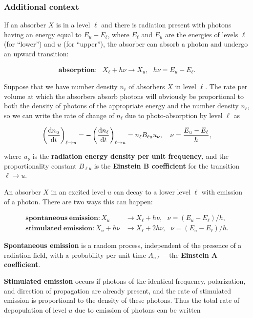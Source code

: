 \documentclass[a4paper,10pt]{article}
\begin{document}
\subsubsection{Additional context}

If an absorber $X$ is in a level $\ell$ and there is radiation present with photons having an energy equal to $E_u-E_\ell$, where $E_\ell$ and $E_u$ are the energies of levels $\ell$ (for ``lower'') and $u$ (for ``upper''), the absorber can absorb a photon and undergo an upward transition:

\begin{align*}
    \mathbf{absorption:} ~~~ X_\ell+h\nu\rightarrow X_u, ~~~ h\nu=E_u-E_\ell.
\end{align*}

{\noindent}Suppose that we have number density $n_\ell$ of absorbers $X$ in level $\ell$. The rate per volume at which the absorbers absorb photons will obviously be proportional to both the density of photons of the appropriate energy and the number density $n_\ell$, so we can write the rate of change of $n_\ell$ due to photo-absorption by level $\ell$ as

\begin{align*}
    \left(\frac{{\rm d}n_u}{{\rm d}t}\right)_{\ell\rightarrow u} = -\left(\frac{{\rm d}n_\ell}{{\rm d}t}\right)_{\ell\rightarrow u} = n_\ell B_{\ell u}u_\nu, ~~~ \nu=\frac{E_u-E_\ell}{h},
\end{align*}

{\noindent}where $u_\nu$ is the \textbf{radiation energy density per unit frequency}, and the proportionality constant $B_{\ell u}$ is the \textbf{Einstein B coefficient} for the transition $\ell\rightarrow u$.

{\noindent}An absorber $X$ in an excited level $u$ can decay to a lower level $\ell$ with emission of a photon. There are two ways this can happen:

\begin{align*}
    \mathbf{spontaneous~emission:} X_u&\rightarrow X_\ell+h\nu, ~~~ \nu=(E_u-E_\ell)/h, \\
    \mathbf{stimulated~emission:} X_u+h\nu&\rightarrow X_\ell+2h\nu, ~~~ \nu=(E_u-E_\ell)/h.
\end{align*}

{\noindent}\textbf{Spontaneous emission} is a random process, independent of the presence of a radiation field, with a probability per unit time $A_{u\ell}$ -- the \textbf{Einstein A coefficient}.

{\noindent}\textbf{Stimulated emission} occurs if photons of the identical frequency, polarization, and direction of propagation are already present, and the rate of stimulated emission is proportional to the density of these photons. Thus the total rate of depopulation of level $u$ due to emission of photons can be written
\end{document}
